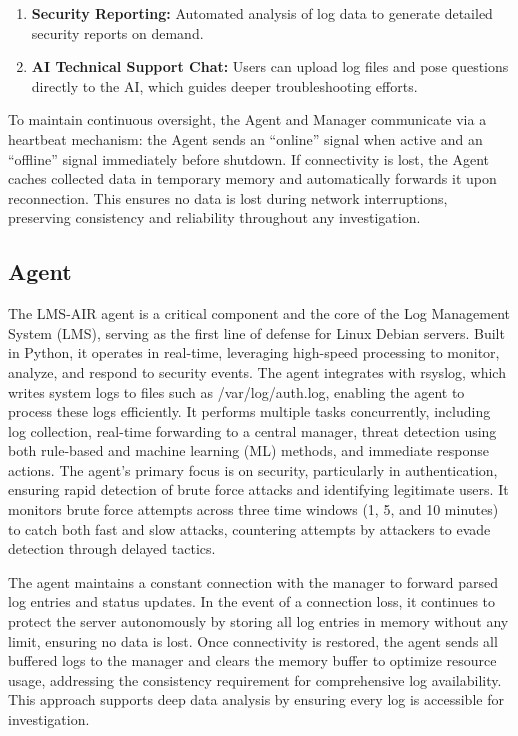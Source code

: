 \begin{enumerate}
    \item \textbf{Security Reporting:} Automated analysis of log data to generate detailed security reports on demand.
    \item \textbf{AI Technical Support Chat:} Users can upload log files and pose questions directly to the AI, which guides deeper troubleshooting efforts.
\end{enumerate}
To maintain continuous oversight, the Agent and Manager communicate via a heartbeat mechanism: the Agent sends an “online” signal when active and an “offline” signal immediately before shutdown. If connectivity is lost, the Agent caches collected data in temporary memory and automatically forwards it upon reconnection. This ensures no data is lost during network interruptions, preserving consistency and reliability throughout any investigation.


\subsection{Agent} 
The LMS-AIR agent is a critical component and the core of the Log Management System (LMS), serving as the first line of defense for Linux Debian servers. Built in Python, it operates in real-time, leveraging high-speed processing to monitor, analyze, and respond to security events. The agent integrates with rsyslog, which writes system logs to files such as /var/log/auth.log, enabling the agent to process these logs efficiently. It performs multiple tasks concurrently, including log collection, real-time forwarding to a central manager, threat detection using both rule-based and machine learning (ML) methods, and immediate response actions. The agent’s primary focus is on security, particularly in authentication, ensuring rapid detection of brute force attacks and identifying legitimate users. It monitors brute force attempts across three time windows (1, 5, and 10 minutes) to catch both fast and slow attacks, countering attempts by attackers to evade detection through delayed tactics.

The agent maintains a constant connection with the manager to forward parsed log entries and status updates. In the event of a connection loss, it continues to protect the server autonomously by storing all log entries in memory without any limit, ensuring no data is lost. Once connectivity is restored, the agent sends all buffered logs to the manager and clears the memory buffer to optimize resource usage, addressing the consistency requirement for comprehensive log availability. This approach supports deep data analysis by ensuring every log is accessible for investigation.

